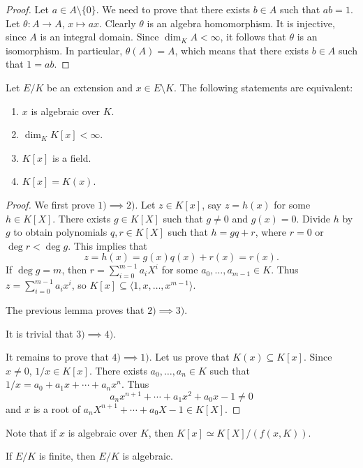 \begin{proof}
	Let $a\in A\setminus\{0\}$. We need to prove that there exists $b\in A$
	such that $ab=1$. Let $\theta\colon A\to A$, $x\mapsto ax$. Clearly
	$\theta$ is an algebra homomorphism. It is injective, since $A$ is an
	integral domain.  Since $\dim_KA<\infty$, it follows that $\theta$ is an
	isomorphism. In particular, $\theta(A)=A$, which means that there exists
	$b\in A$ such that $1=ab$. 
\end{proof}

\begin{theorem}
	Let $E/K$ be an extension and $x\in E\setminus K$.
	The following statements are equivalent:
	\begin{enumerate}
		\item $x$ is algebraic over $K$.
		\item $\dim_KK[x]<\infty$.
		\item $K[x]$ is a field.
		\item $K[x]=K(x)$. 
	\end{enumerate}
\end{theorem}

\begin{proof}
	We first prove $1)\implies 2)$. Let $z\in K[x]$, say $z=h(x)$ for some $h\in K[X]$. There exists
	$g\in K[X]$ such that $g\ne 0$ and $g(x)=0$. Divide $h$ by $g$ to obtain 
	polynomials $q,r\in K[X]$ such that $h=gq+r$, where $r=0$ or $\deg r<\deg g$. This implies that
	\[
		z=h(x)=g(x)q(x)+r(x)=r(x).
	\]
	If $\deg g=m$, then $r=\sum_{i=0}^{m-1}a_iX^i$ for some $a_0,\dots,a_{m-1}\in K$. Thus
	$z=\sum_{i=0}^{m-1}a_ix^i$, so $K[x]\subseteq\langle 1,x,\dots,x^{m-1}\rangle$. 

	The previous lemma proves that $2)\implies 3)$. 

	It is trivial that $3)\implies 4)$. 

	It remains to prove that $4)\implies 1)$. Let us prove that $K(x)\subseteq K[x]$. 
	Since $x\ne 0$, $1/x\in K[x]$. There exists $a_0,\dots,a_n\in K$ such that
	$1/x=a_0+a_1x+\cdots+a_nx^n$. Thus
	\[
		a_nx^{n+1}+\cdots+a_1x^2+a_0x-1\ne 0
	\]
	and $x$ is a root of $a_nX^{n+1}+\cdots+a_0X-1\in K[X]$. 
\end{proof}

Note that if $x$ is algebraic over $K$, then
$K[x]\simeq K[X]/(f(x,K))$. 

\begin{corollary}
	If $E/K$ is finite, then $E/K$ is algebraic. 
\end{corollary}

